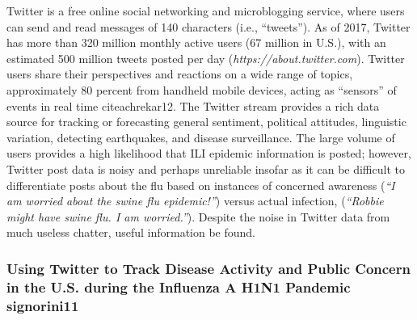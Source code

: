 \documentclass[sigconf]{acmart}
\begin{document}
Twitter is a free online social networking and microblogging service, where users can send 
and read messages of 140 characters (i.e., ``tweets''). As of 2017, Twitter has more than 
320 million monthly active users (67 million in U.S.), with an estimated 500 million tweets 
posted per day ({\it https://about.twitter.com}). Twitter users share their perspectives and 
reactions on a wide range of topics, approximately 80 percent from handheld mobile devices, 
acting as ``sensors'' of events in real time cite{achrekar12}. The Twitter stream provides 
a rich data source for tracking or forecasting general sentiment, political attitudes, 
linguistic variation, detecting earthquakes, and disease surveillance. The large volume of 
users provides a high likelihood that ILI epidemic information is posted; however, Twitter 
post data is noisy and perhaps unreliable insofar as it can be difficult to differentiate 
posts about the flu based on instances of concerned awareness ({\it ``I am worried about 
the swine flu epidemic!''}) versus actual infection, ({\it ``Robbie might have swine flu. 
I am worried.''})\cite{lamb13}. Despite the noise in Twitter data from much useless chatter, 
useful information be found. 

\subsubsection{Using Twitter to Track Disease Activity and Public Concern in the 
U.S. during the Influenza A H1N1 Pandemic {signorini11}}
\end{document}
